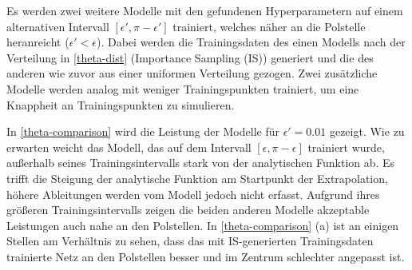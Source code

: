 Es werden zwei weitere Modelle mit den gefundenen Hyperparametern auf einem alternativen Intervall $[\epsilon', \pi-\epsilon']$ trainiert, welches näher an die Polstelle heranreicht ($\epsilon' < \epsilon$).  Dabei werden die Trainingsdaten des einen Modells nach der Verteilung in \textsf{\autoref{theta-dist}} (Importance Sampling (IS)) generiert und die des anderen wie zuvor aus einer uniformen Verteilung gezogen. Zwei zusätzliche Modelle werden analog mit weniger Trainingspunkten trainiert, um eine Knappheit an Trainingspunkten zu simulieren. 

In \textsf{\autoref{theta-comparison}} wird die Leistung der Modelle für $\epsilon' = 0.01$ gezeigt. Wie zu erwarten weicht das Modell, das auf dem Intervall $[\epsilon, \pi-\epsilon]$ trainiert wurde, außerhalb seines Trainingsintervalls stark von der analytischen Funktion ab. Es trifft die Steigung der analytische Funktion am Startpunkt der Extrapolation, höhere Ableitungen werden vom Modell jedoch nicht erfasst. Aufgrund ihres größeren Trainingsintervalls zeigen die beiden anderen Modelle akzeptable Leistungen auch nahe an den Polstellen. In \textsf{\autoref{theta-comparison} (a)} ist an einigen Stellen am Verhältnis zu sehen, dass das mit IS-generierten Trainingsdaten trainierte Netz an den Polstellen besser und im Zentrum schlechter angepasst ist.
